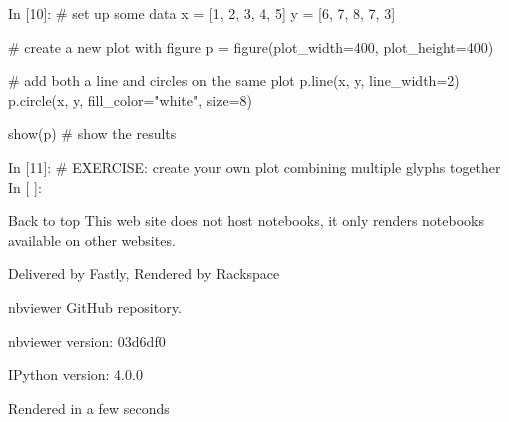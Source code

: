 In [10]:
# set up some data
x = [1, 2, 3, 4, 5]
y = [6, 7, 8, 7, 3]

# create a new plot with figure
p = figure(plot_width=400, plot_height=400)

# add both a line and circles on the same plot
p.line(x, y, line_width=2)
p.circle(x, y, fill_color="white", size=8)

show(p) # show the results
	
In [11]:
# EXERCISE: create your own plot combining multiple glyphs together
In [ ]:
 
Back to top
This web site does not host notebooks, it only renders notebooks available on other websites.

Delivered by Fastly, Rendered by Rackspace

nbviewer GitHub repository.

nbviewer version: 03d6df0

IPython version: 4.0.0

Rendered in a few seconds
